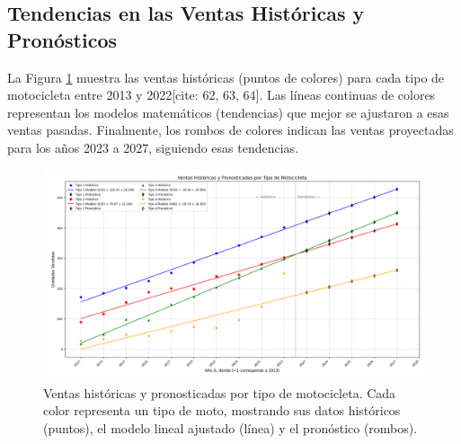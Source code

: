 \documentclass[12pt,a4paper]{article}
\begin{document}
\subsection{Tendencias en las Ventas Históricas y Pronósticos}
La Figura \ref{fig:ventas_combinada_img} muestra las ventas históricas (puntos de colores) para cada tipo de motocicleta entre 2013 y 2022[cite: 62, 63, 64]. Las líneas continuas de colores representan los modelos matemáticos (tendencias) que mejor se ajustaron a esas ventas pasadas. Finalmente, los rombos de colores indican las ventas proyectadas para los años 2023 a 2027, siguiendo esas tendencias.
\begin{figure}[H]
\centering
\includegraphics[width=\textwidth]{Ventas historicas y pronosticadas por tipo moto.png}
\caption{Ventas históricas y pronosticadas por tipo de motocicleta. Cada color representa un tipo de moto, mostrando sus datos históricos (puntos), el modelo lineal ajustado (línea) y el pronóstico (rombos).}
\label{fig:ventas_combinada_img}
\end{figure}
\end{document}
